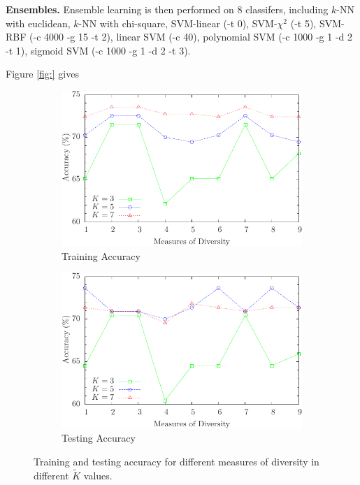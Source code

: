 \textbf{Ensembles.} Ensemble learning is then performed on 8 classifers, including $k$-NN with euclidean, $k$-NN with chi-square, SVM-linear (-t 0), SVM-$\chi^2$ (-t 5), SVM-RBF (-c 4000 -g 15 -t 2), linear SVM (-c 40), polynomial SVM (-c 1000 -g 1 -d 2 -t 1), sigmoid SVM (-c 1000 -g 1 -d 2 -t 3). 

Figure \ref{fig:} gives 

\begin{figure} [t]
\centering
\begin{subfigure}{.45\textwidth}
  \centering
  \includegraphics[width=.95\linewidth]{../Figure/diversity_k_train}
  \caption{Training Accuracy}
  \label{fig:diversity_k_train}
\end{subfigure}%
\begin{subfigure}{.45\textwidth}
  \centering
  \includegraphics[width=.95\linewidth]{../Figure/diversity_k_test}
  \caption{Testing Accuracy}
  \label{fig:diversity_k_test}
\end{subfigure}
\caption{Training and testing accuracy for different measures of diversity in different $\tilde{K}$ values.}
\label{fig:threshoulds}
\end{figure}

